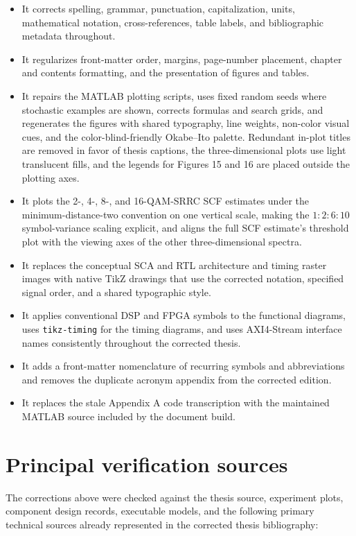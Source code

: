 \documentclass[12pt]{article}
\begin{document}
\begin{itemize}
  \item It corrects spelling, grammar, punctuation, capitalization, units, mathematical notation, cross-references, table labels, and bibliographic metadata throughout.
  \item It regularizes front-matter order, margins, page-number placement, chapter and contents formatting, and the presentation of figures and tables.
  \item It repairs the MATLAB plotting scripts, uses fixed random seeds where stochastic examples are shown, corrects formulas and search grids, and regenerates the figures with shared typography, line weights, non-color visual cues, and the color-blind-friendly Okabe--Ito palette. Redundant in-plot titles are removed in favor of thesis captions, the three-dimensional plots use light translucent fills, and the legends for Figures 15 and 16 are placed outside the plotting axes.
  \item It plots the 2-, 4-, 8-, and 16-QAM-SRRC SCF estimates under the minimum-distance-two convention on one vertical scale, making the $1{:}2{:}6{:}10$ symbol-variance scaling explicit, and aligns the full SCF estimate's threshold plot with the viewing axes of the other three-dimensional spectra.
  \item It replaces the conceptual SCA and RTL architecture and timing raster images with native TikZ drawings that use the corrected notation, specified signal order, and a shared typographic style.
  \item It applies conventional DSP and FPGA symbols to the functional diagrams, uses \texttt{tikz-timing} for the timing diagrams, and uses AXI4-Stream interface names consistently throughout the corrected thesis.
  \item It adds a front-matter nomenclature of recurring symbols and abbreviations and removes the duplicate acronym appendix from the corrected edition.
  \item It replaces the stale Appendix A code transcription with the maintained MATLAB source included by the document build.
\end{itemize}

\section{Principal verification sources}

The corrections above were checked against the thesis source, experiment plots, component design records, executable models, and the following primary technical sources already represented in the corrected thesis bibliography:
\end{document}
